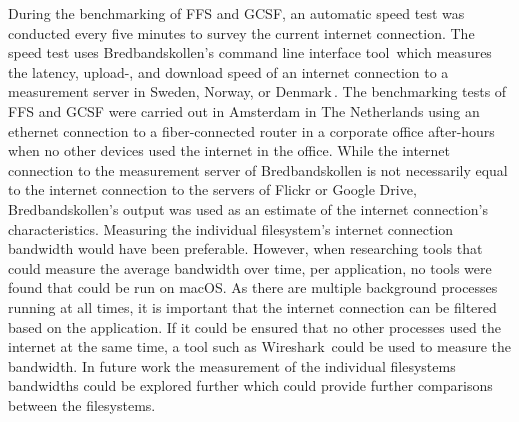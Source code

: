 During the benchmarking of \gls{FFS} and \gls{GCSF}, an automatic speed test was conducted every five minutes to survey the current internet connection. The speed test uses Bredbandskollen's command line interface tool\,\cite{internetstiftelsenBredbandskollenCLIBredbandskollen} which measures the latency, upload-, and download speed of an internet connection to a measurement server in Sweden, Norway, or Denmark\,\cite{internetstiftelsenMerOmBredbandskollen}. The benchmarking tests of \gls{FFS} and \gls{GCSF} were carried out in Amsterdam in The Netherlands using an ethernet connection to a \mbox{fiber-connected} router in a corporate office after-hours when no other devices used the internet in the office. While the internet connection to the measurement server of Bredbandskollen is not necessarily equal to the internet connection to the servers of Flickr or Google Drive, Bredbandskollen's output was used as an estimate of the internet connection's characteristics. Measuring the individual filesystem's internet connection bandwidth would have been preferable. However, when researching tools that could measure the average bandwidth over time, per application, no tools were found that could be run on macOS. As there are multiple background processes running at all times, it is important that the internet connection can be filtered based on the application. If it could be ensured that no other processes used the internet at the same time, a tool such as Wireshark\,\cite{WiresharkGoDeep} could be used to measure the bandwidth. In future work the measurement of the individual filesystems bandwidths could be explored further which could provide further comparisons between the filesystems.
